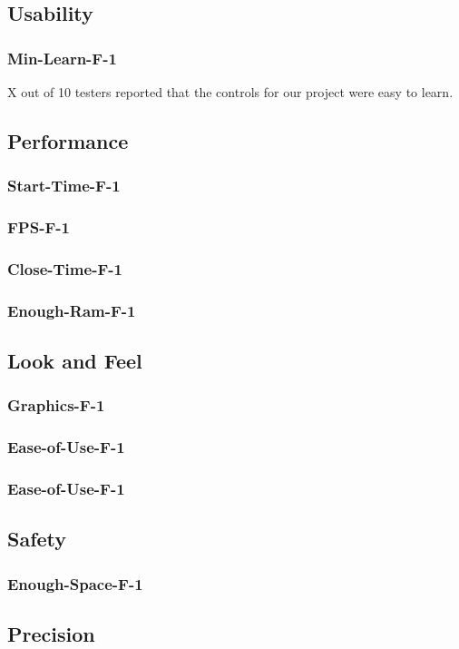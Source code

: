 \documentclass[12pt, titlepage]{article}
\begin{document}
\subsection{Usability}
		\subsubsection{Min-Learn-F-1}
		
		X out of 10 testers reported that the controls for our project were easy to learn.
\subsection{Performance}
	\subsubsection{Start-Time-F-1}
	\subsubsection{FPS-F-1}
	\subsubsection{Close-Time-F-1}
	\subsubsection{Enough-Ram-F-1}
\subsection{Look and Feel}
	\subsubsection{Graphics-F-1}
	\subsubsection{Ease-of-Use-F-1}
	\subsubsection{Ease-of-Use-F-1}
\subsection{Safety}
	\subsubsection{Enough-Space-F-1}
\subsection{Precision}
\end{document}
